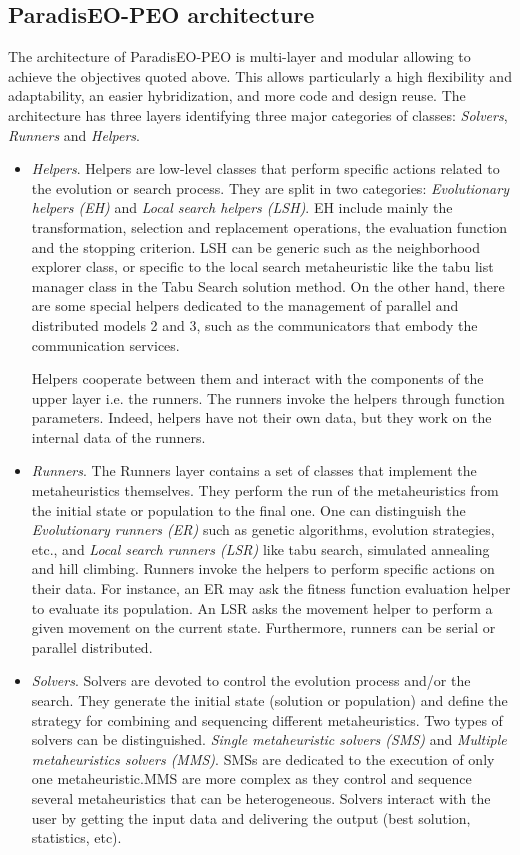 \subsection{Paradis\-EO-PEO architecture}\label{main_architecture}
The architecture of Paradis\-EO-PEO is multi-layer and modular allowing to achieve the objectives quoted above. This allows particularly a high flexibility and adaptability, an easier hybridization, and more code and design reuse. The architecture has three layers identifying three major categories of classes: {\em Solvers\/}, {\em Runners\/} and {\em Helpers\/}. \begin{itemize}
\item {\em Helpers\/}. Helpers are low-level classes that perform specific actions related to the evolution or search process. They are split in two categories: {\em Evolutionary helpers (EH)\/} and {\em Local search helpers (LSH)\/}. EH include mainly the transformation, selection and replacement operations, the evaluation function and the stopping criterion. LSH can be generic such as the neighborhood explorer class, or specific to the local search metaheuristic like the tabu list manager class in the Tabu Search solution method. On the other hand, there are some special helpers dedicated to the management of parallel and distributed models 2 and 3, such as the communicators that embody the communication services.

Helpers cooperate between them and interact with the components of the upper layer i.e. the runners. The runners invoke the helpers through function parameters. Indeed, helpers have not their own data, but they work on the internal data of the runners.

\item {\em Runners\/}. The Runners layer contains a set of classes that implement the metaheuristics themselves. They perform the run of the metaheuristics from the initial state or population to the final one. One can distinguish the {\em Evolutionary runners (ER)\/} such as genetic algorithms, evolution strategies, etc., and {\em Local search runners (LSR)\/} like tabu search, simulated annealing and hill climbing. Runners invoke the helpers to perform specific actions on their data. For instance, an ER may ask the fitness function evaluation helper to evaluate its population. An LSR asks the movement helper to perform a given movement on the current state. Furthermore, runners can be serial or parallel distributed.

\item {\em Solvers\/}. Solvers are devoted to control the evolution process and/or the search. They generate the initial state (solution or population) and define the strategy for combining and sequencing different metaheuristics. Two types of solvers can be distinguished. {\em Single metaheuristic solvers (SMS)\/} and {\em Multiple metaheuristics solvers (MMS)\/}. SMSs are dedicated to the execution of only one metaheuristic.MMS are more complex as they control and sequence several metaheuristics that can be heterogeneous. Solvers interact with the user by getting the input data and delivering the output (best solution, statistics, etc). \end{itemize}


